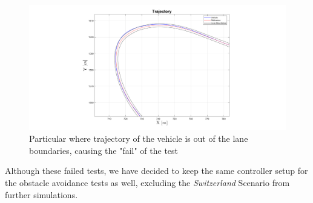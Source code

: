     \begin{figure}[H]
    \centering
    \includegraphics[width=1\textwidth]{Figures/Switz_fail.png}
    \caption{Particular where trajectory of the vehicle is out of the lane boundaries, causing the "fail" of the test}
      \label{fig:SwitzFail}
\end{figure}


Although these failed tests, we have decided to keep the same controller setup for the obstacle avoidance tests as well, excluding the \textit{Switzerland} Scenario from further simulations.




